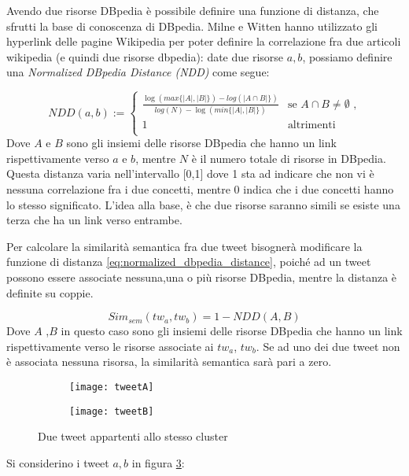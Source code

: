 Avendo due risorse DBpedia è possibile definire una funzione di
distanza, che sfrutti la base di conoscenza di DBpedia. 
Milne e Witten \cite{Milne08aneffective} hanno utilizzato gli hyperlink delle pagine Wikipedia per poter definire la correlazione fra due articoli wikipedia (e quindi due risorse dbpedia): date due risorse $a,b$, possiamo definire una \emph{Normalized DBpedia Distance (NDD)} come segue:

\begin{equation} \label{eq:normalized_dbpedia_distance}
NDD(a,b):=\begin{cases}
\frac{\log(max\{|A|,|B|\})-log( |A \cap B|\})}{log(N)-\log(min\{|A|,|B|\})} & \text{se $A \cap B \neq \emptyset $  ,}\\
1 & \text{altrimenti}\\
\end{cases}
\end{equation}
Dove $A$ e $B$  sono gli insiemi delle risorse DBpedia che hanno un link rispettivamente verso $a$ e $b$, mentre $N$ è il numero totale di risorse in DBpedia. Questa distanza varia nell'intervallo [0,1] dove 1 sta ad indicare che non vi è nessuna correlazione fra i due concetti, mentre 0 indica che i due concetti hanno lo stesso significato. L'idea alla base, è che due risorse saranno simili se esiste una terza che ha un link verso entrambe.
 
 Per calcolare la similarità semantica fra due tweet bisognerà modificare la
funzione di distanza \ref{eq:normalized_dbpedia_distance},  poiché ad un tweet possono essere associate nessuna,una o più risorse DBpedia, mentre la distanza è definite su coppie.

\begin{equation}
Sim_{sem}(tw_a,tw_b)=1-NDD(A,B)
\end{equation}
Dove $A$ ,$B$ in questo caso sono gli insiemi delle risorse DBpedia che hanno un link rispettivamente verso le risorse associate ai $tw_a$, $tw_b$. Se ad uno dei due tweet non è associata nessuna risorsa, la similarità semantica sarà pari a zero.
 

 
\begin{figure}
    \centering
    \begin{subfigure}[b]{0.45\textwidth}
        \centering
        \texttt{[image: tweetA]}
        \caption{}
        \label{fig:tweeta}
    \end{subfigure}
    \hfill
    \begin{subfigure}[b]{0.45\textwidth}
        \centering
        \texttt{[image: tweetB]}
       \caption{}
        \label{fig:tweetb}
    \end{subfigure}
    \hfill
    
    \caption{Due tweet appartenti allo stesso cluster}
    \label{fig:twotweets}
\end{figure} 
Si considerino i tweet $a,b$ in figura \ref{fig:twotweets}:

